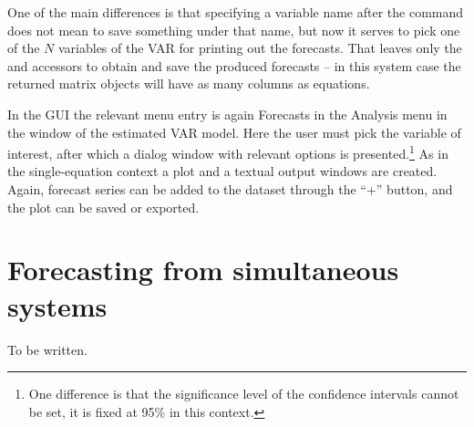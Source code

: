 One of the main differences is that specifying a variable name after the
 command does not mean to save something under that name, but 
now it serves to pick one of the $N$ variables of the VAR for printing
out the forecasts. That leaves only the  and 
accessors to obtain and save the produced forecasts -- in this system 
case the returned matrix objects will have as many columns as equations.

In the GUI the relevant menu entry is again Forecasts in the Analysis 
menu in the window of the estimated VAR model. Here the user must pick
the variable of interest, after which a dialog window with relevant 
options is presented.\footnote{One difference is that the significance
level of the confidence intervals cannot be set, it is fixed at 95\% in
this context.} As in the single-equation context a plot and a textual
output windows are created. Again, forecast series can be added to the 
dataset through the ``+'' button, and the plot can be saved or exported.

\section{Forecasting from simultaneous systems}
\label{sec:fcast-system}

To be written.

    
